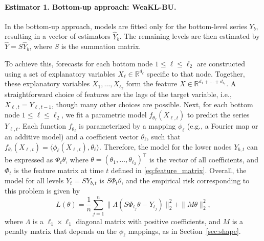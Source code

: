 \paragraph{Estimator 1. Bottom-up approach: WeaKL-BU.} In the bottom-up approach, models are fitted only for the bottom-level series $Y_b$, resulting in a vector of estimators $\hat{Y}_b$. The remaining levels are then estimated by $\hat{Y} = S \hat{Y}_b$, where $S$ is the summation matrix. 

To achieve this, forecasts for each bottom node $1 \leq \ell \leq \ell_2$ are constructed using a set of explanatory variables $X_\ell \in \mathbb R^{d_\ell}$ specific to that node. Together, these explanatory variables $X_1, \hdots, X_{\ell_2}$ form the feature $X\in \mathbb R^{d_1+\dots +d_{\ell_2}}$. A straightforward choice of features are the lags of the target variable, i.e., $X_{\ell, t} = Y_{\ell, t-1}$, though many other choices are possible. Next, for each bottom node $1 \leq \ell \leq \ell_2$, we fit a parametric model $f_{\theta_\ell}(X_{\ell, t})$ to predict the series $Y_{\ell, t}$. 
Each function $f_{\theta_\ell}$ is parameterized by a mapping $\phi_\ell$ (e.g., a Fourier map or an additive model) and a coefficient vector $\theta_\ell$, such that
$f_{\theta_\ell}(X_{\ell,t}) = \langle \phi_\ell(X_{\ell,t}), \theta_\ell \rangle$.
Therefore, the model for the lower nodes $Y_{b, t}$ can be expressed as $\mathbb \Phi_t \theta$, where  $\theta = (\theta_1, \hdots, \theta_{\ell_2})^\top$ is the vector of all coefficients, and $\mathbb{\Phi}_t$ is the feature matrix at time $t$ defined in \eqref{eq:feature_matrix}. 
Overall, the model for all levels $Y_t = S Y_{b, t}$ is $S \mathbb{\Phi}_t \theta$, and the empirical risk corresponding to this problem is given by
\[L(\theta) = \frac{1}{n}\sum_{j=1}^n\|\Lambda( S\mathbb \Phi_{t_j} \theta - Y_{t_j})\|_2^2 + \|M\theta\|_2^2,\]
where $\Lambda$ is a $\ell_1\times \ell_1$ diagonal matrix with positive coefficients,  and $M$ is a penalty matrix that depends on the $\phi_\ell$ mappings, as in Section~\ref{sec:shape}. 


